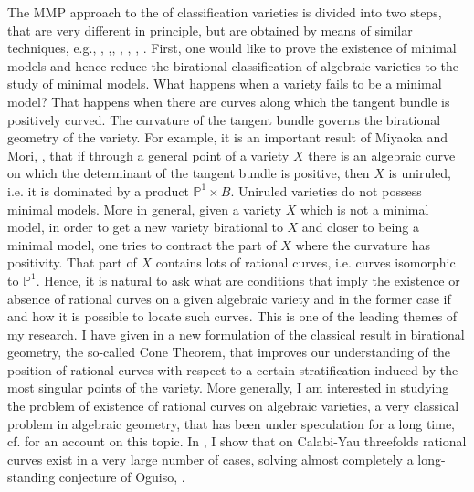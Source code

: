 \documentclass[10.9pt]{res} %
\numberwithin{equation}{section}
\theoremstyle{definition}
\begin{document}
\begin{resume}
The MMP approach to the of classification varieties is divided into two steps, that are very different in principle, 
but are obtained by means of similar techniques, e.g., \cite{ueno.book.75}, \cite{kmm87},\cite{koll-etal-book}, 
\cite{koll-mor-book}, \cite{vieh.book.95}, \cite{kol.mod.13}, \cite{koll-book13}.\newline
First, one would like to prove the existence of minimal models and hence reduce the 
birational classification of algebraic varieties to the study of minimal models. \newline
What happens when a variety fails to be a minimal model? 
That happens when there are curves along which the tangent bundle is positively curved. 
The curvature of the tangent bundle governs the birational geometry of the variety.
For example, it is an important result of Miyaoka and Mori, \cite{miy.mor.unirul.86}, 
that if through a general point of a variety $X$ there is an algebraic curve on which the 
determinant of the tangent bundle is positive, then $X$ is uniruled, i.e. it is dominated by a product $\mathbb{P}^1 \times B$.
Uniruled varieties do not possess minimal models.
More in general, given a variety $X$ which is not a minimal model, in order to get a new variety birational to $X$ 
and closer to being a minimal model, one tries to contract the part of $X$ where 
the curvature has positivity. That part of $X$ contains lots of rational curves, i.e. curves isomorphic to $\mathbb{P}^1$. 
Hence, it is natural to ask what are conditions that imply the existence or absence of rational curves on a given algebraic variety
and in the former case if and how it is possible to locate such curves. This is one of the leading themes of my research.
I have given in \cite{mio.hyperb} a new formulation of the classical result in birational geometry, the so-called Cone Theorem, that improves
our understanding of the position of rational curves with respect to a certain stratification induced by the most singular points of the variety.
More generally, I am interested in studying the problem of existence of rational curves on algebraic varieties,
a very classical problem in algebraic geometry, that has been under speculation for a long time, cf. \cite{dem2012} for an account on this topic.
In \cite{mio.cy}, I show that on Calabi-Yau threefolds rational curves exist in a very large number of cases, 
solving almost completely a long-standing conjecture of Oguiso, \cite{Ogui93}.


\end{resume}
\end{document}
